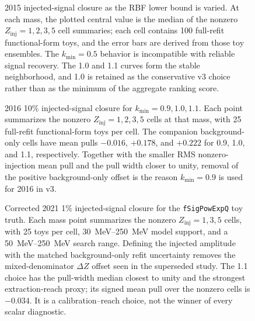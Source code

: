 \begin{figure}[p]
\centering
{}
\caption{2015 injected-signal closure as the RBF lower bound is varied. At each mass,
the plotted central value is the median of the nonzero
$Z_{\mathrm{inj}}=1,2,3,5$ cell summaries; each cell contains 100 full-refit
functional-form toys, and the error bars are derived from those toy ensembles. The
$k_{\min}=0.5$ behavior is incompatible with reliable signal recovery. The 1.0 and 1.1
curves form the stable neighborhood, and 1.0 is retained as the conservative v3
choice rather than as the minimum of the aggregate ranking score.}
\label{fig:v3-lslb-closure-2015}
\end{figure}

\begin{figure}[p]
\centering
{}
\caption{2016 10\% injected-signal closure for
$k_{\min}=0.9,1.0,1.1$. Each point summarizes the nonzero
$Z_{\mathrm{inj}}=1,2,3,5$ cells at that mass, with 25 full-refit functional-form toys
per cell. The companion background-only cells have mean pulls $-0.016$, $+0.178$, and
$+0.222$ for 0.9, 1.0, and 1.1, respectively. Together with the smaller RMS
nonzero-injection mean pull and the pull width closer to unity, removal of the positive
background-only offset is the reason $k_{\min}=0.9$ is used for 2016 in v3.}
\label{fig:v3-lslb-closure-2016}
\end{figure}

\begin{figure}[p]
\centering
{}
\caption{Corrected 2021 1\% injected-signal closure for the
\texttt{fSigPowExpQ} toy truth. Each mass point summarizes the nonzero
$Z_{\mathrm{inj}}=1,3,5$ cells, with 25 toys per cell, \SIrange{30}{250}{MeV} model
support, and a \SIrange{50}{250}{MeV} search range. Defining the injected amplitude
with the matched background-only refit uncertainty removes the mixed-denominator
$\Delta Z$ offset seen in the superseded study. The 1.1 choice has the pull-width
median closest to unity and the strongest extraction-reach proxy; its signed mean pull
over the nonzero cells is $-0.034$. It is a calibration--reach choice, not the winner of
every scalar diagnostic.}
\label{fig:v3-lslb-closure-2021}
\end{figure}

